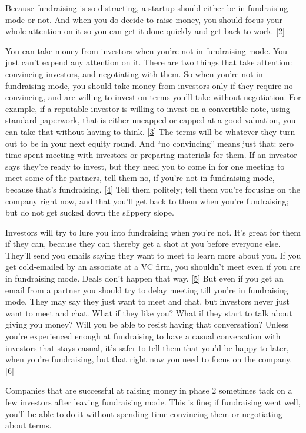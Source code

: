 Because fundraising is so distracting, a startup should either be in
fundraising mode or not. And when you do decide to raise money, you
should focus your whole attention on it so you can get it done quickly
and get back to work. {[}\hyperref[f2n]{2}{]}

You can take money from investors when you're not in fundraising mode.
You just can't expend any attention on it. There are two things that
take attention: convincing investors, and negotiating with them. So when
you're not in fundraising mode, you should take money from investors
only if they require no convincing, and are willing to invest on terms
you'll take without negotiation. For example, if a reputable investor is
willing to invest on a convertible note, using standard paperwork, that
is either uncapped or capped at a good valuation, you can take that
without having to think. {[}\hyperref[f3n]{3}{]} The terms will be
whatever they turn out to be in your next equity round. And ``no
convincing'' means just that: zero time spent meeting with investors or
preparing materials for them. If an investor says they're ready to
invest, but they need you to come in for one meeting to meet some of the
partners, tell them no, if you're not in fundraising mode, because
that's fundraising. {[}\hyperref[f4n]{4}{]} Tell them politely; tell
them you're focusing on the company right now, and that you'll get back
to them when you're fundraising; but do not get sucked down the slippery
slope.

Investors will try to lure you into fundraising when you're not. It's
great for them if they can, because they can thereby get a shot at you
before everyone else. They'll send you emails saying they want to meet
to learn more about you. If you get cold-emailed by an associate at a VC
firm, you shouldn't meet even if you are in fundraising mode. Deals
don't happen that way. {[}\hyperref[f5n]{5}{]} But even if you get an
email from a partner you should try to delay meeting till you're in
fundraising mode. They may say they just want to meet and chat, but
investors never just want to meet and chat. What if they like you? What
if they start to talk about giving you money? Will you be able to resist
having that conversation? Unless you're experienced enough at
fundraising to have a casual conversation with investors that stays
casual, it's safer to tell them that you'd be happy to later, when
you're fundraising, but that right now you need to focus on the company.
{[}\hyperref[f6n]{6}{]}

Companies that are successful at raising money in phase 2 sometimes tack
on a few investors after leaving fundraising mode. This is fine; if
fundraising went well, you'll be able to do it without spending time
convincing them or negotiating about terms.

